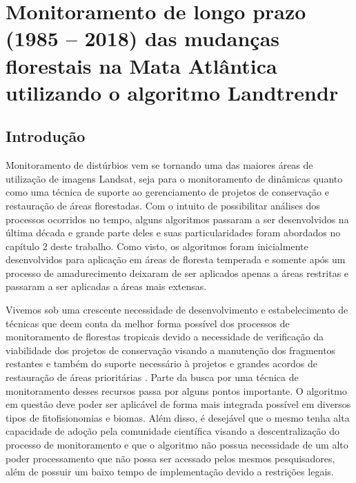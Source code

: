 \section{Monitoramento de longo prazo (1985 – 2018) das mudanças florestais na Mata Atlântica utilizando o algoritmo Landtrendr}
\subsection{Introdução}
\hspace{13pt} Monitoramento de distúrbios vem se tornando uma das maiores áreas de utilização de imagens Landsat, seja para o monitoramento de dinâmicas quanto como uma técnica de suporte ao gerenciamento de projetos de conservação e restauração de áreas florestadas. Com o intuito de possibilitar análises dos processos ocorridos no tempo, alguns algoritmos passaram a ser desenvolvidos na última década e grande parte deles e suas particularidades foram abordados no capítulo 2 deste trabalho. Como visto, os algoritmos foram inicialmente desenvolvidos para aplicação em áreas de floresta temperada e somente após um processo de amadurecimento deixaram de ser aplicados apenas a áreas restritas e passaram a ser aplicadas a áreas mais extensas. 

Vivemos sob uma crescente necessidade de desenvolvimento e estabelecimento de técnicas que deem conta da melhor forma possível dos processos de monitoramento de florestas tropicais devido a necessidade de verificação da viabilidade dos projetos de conservação visando a manutenção dos fragmentos restantes e também do suporte necessário à projetos e grandes acordos de restauração de áreas prioritárias \citep{strassburg_strategic_2019}. Parte da busca por uma técnica de monitoramento desses recursos passa por alguns pontos importante. O algoritmo em questão deve poder ser aplicável de forma mais integrada possível em diversos tipos de fitofisionomias e biomas. Além disso, é desejável que o mesmo tenha alta capacidade de adoção pela comunidade científica visando a descentralização do processo de monitoramento e que o algoritmo não possua necessidade de um alto poder processamento que não possa ser acessado pelos mesmos pesquisadores, além de possuir um baixo tempo de implementação devido a restrições legais.

